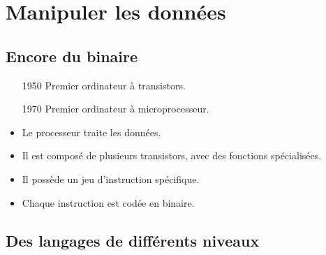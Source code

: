 \section[Manipuler]{Manipuler les données}
\subsection{Encore du binaire}

\begin{slide}
	\begin{itemize}
		\item[1950] Premier ordinateur à transistors.
		\item[1970] Premier ordinateur à microprocesseur. %
	\end{itemize}
\end{slide}

\begin{slide}
	\begin{itemize}
		\item Le processeur traite les données.
		\item Il est composé de plusieurs transistors, avec des fonctions spécialisées.
		\item Il possède un jeu d'instruction spécifique.
		\item Chaque instruction est codée en binaire.
	\end{itemize}
\end{slide}

\subsection{Des langages de différents niveaux}

